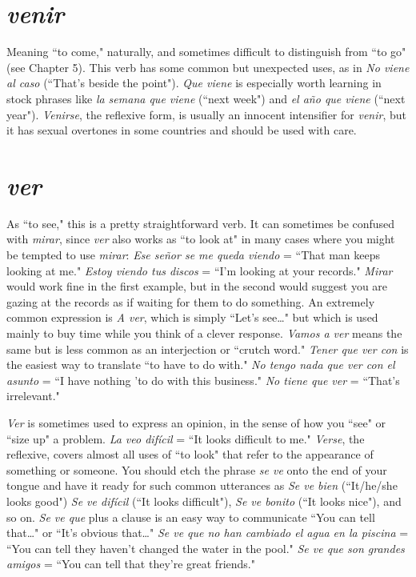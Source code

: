 \section{\emph{venir}}

Meaning ``to come," naturally, and sometimes difficult to distinguish from ``to go" (see Chapter 5). This verb has some common
but unexpected uses, as in \emph{No viene al caso} (``That's beside the point").
\emph{Que viene} is especially worth learning in stock phrases like \emph{la semana
que viene} (``next week") and \emph{el año que viene} (``next year"). \emph{Venirse},
the reflexive form, is usually an innocent intensifier for \emph{venir}, but it
has sexual overtones in some countries and should be used with care.

\section{\emph{ver}}

As ``to see," this is a pretty straightforward verb. It can sometimes be confused with \emph{mirar}, since \emph{ver} also works as ``to look at" in
many cases where you might be tempted to use \emph{mirar}: \emph{Ese señor se me
queda viendo} = ``That man keeps looking at me." \emph{Estoy viendo tus
discos} = ``I'm looking at your records." \emph{Mirar} would work fine in the
first example, but in the second would suggest you are gazing at the
records as if waiting for them to do something. An extremely common
expression is \emph{A ver}, which is simply ``Let's see\ldots{}" but which is used
mainly to buy time while you think of a clever response. \emph{Vamos a
ver} means the same but is less common as an interjection or ``crutch
word." \emph{Tener que ver con} is the easiest way to translate ``to have to do
with." \emph{No tengo nada que ver con el asunto} = ``I have nothing 'to do
with this business." \emph{No tiene que ver} = ``That's irrelevant."

\emph{Ver} is sometimes used to express an opinion, in the sense of
how you ``see" or ``size up" a problem. \emph{La veo difícil} = ``It looks difficult to me." \emph{Verse}, the reflexive, covers almost all uses of ``to look"
that refer to the appearance of something or someone. You should etch
the phrase \emph{se ve} onto the end of your tongue and have it ready for such
common utterances as \emph{Se ve bien} (``It/he/she looks good") \emph{Se ve difícil}
(``It looks difficult"), \emph{Se ve bonito} (``It looks nice"), and so on. \emph{Se ve que}
plus a clause is an easy way to communicate ``You can tell that\ldots{}" or
``It's obvious that\ldots{}" \emph{Se ve que no han cambiado el agua en la piscina} = ``You can tell they haven't changed the water in the pool." \emph{Se
ve que son grandes amigos} = ``You can tell that they're great friends."

